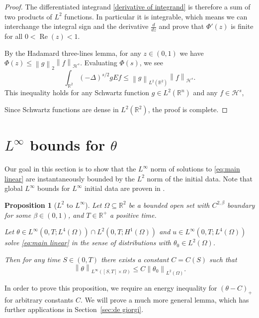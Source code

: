 \documentclass[11pt]{amsart}
\newtheorem{proposition}[theorem]{Proposition}
\theoremstyle{remark}
\theoremstyle{definition}
\newcommand{\R}{\mathbb{R}}
\newcommand{\norm}[1]{\left\lVert#1\right\rVert}
\newcommand{\paren}[1]{\left( #1 \right)}
\newcommand{\Laplace}{\Delta}
\renewcommand{\Re}{\operatorname{Re}}
\newcommand{\ddz}{\frac{d}{dz}}
\newcommand{\HD}{\mathcal{H}}
\begin{document}
\begin{proof}
The differentiated integrand \eqref{derivative of integrand} is therefore a sum of two products of $L^2$ functions.  In particular it is integrable, which means we can interchange the integral sign and the derivative $\ddz$ and prove that $\Phi'(z)$ is finite for all $0<\Re(z)<1$. 

By the Hadamard three-lines lemma, for any $z \in (0,1)$ we have $\Phi(z) \leq \norm{g}_2 \norm{f}_{\HD^s}$.  
Evaluating $\Phi(s)$, we see
\[ \int_{\R^2} \paren{-\Laplace}^{s/2} g E f \leq \norm{g}_{L^2(\R^2)} \norm{f}_{\HD^s}. \]
This inequality holds for any Schwartz function $g \in L^2(\R^n)$ and any $f \in \HD^{s}$,

Since Schwartz functions are dense in $L^2(\R^2)$, the proof is complete.  
\end{proof}






\section{$L^\infty$ bounds for $\theta$} \label{sec:Linfty}

Our goal in this section is to show that the $L^\infty$ norm of solutions to \eqref{eq:main linear} are instantaneously bounded by the $L^2$ norm of the initial data.  Note that global $L^\infty$ bounds for $L^\infty$ initial data are proven in \cite{CoIg.sqg}.  

\begin{proposition}[$L^2$ to $L^\infty$] \label{thm:L2 to Linfty}
Let $\Omega \subseteq \R^2$ be a bounded open set with $C^{2,\beta}$ boundary for some $\beta \in (0,1)$, and $T \in \R^+$ a positive time.  

Let $\theta \in L^\infty(0,T; L^4(\Omega)) \cap L^2(0,T; H^1(\Omega))$ and $u \in L^\infty(0,T; L^4(\Omega))$ solve \eqref{eq:main linear} in the sense of distributions with $\theta_0 \in L^2(\Omega)$.  

Then for any time $S \in (0,T)$ there exists a constant $C = C(S)$ such that
\[ \norm{\theta}_{L^\infty([S,T]\times \Omega)} \leq C \norm{\theta_0}_{L^2(\Omega)}. \]
\end{proposition}

In order to prove this proposition, we require an energy inequality for $(\theta-C)_+$ for arbitrary constants $C$.  We will prove a much more general lemma, which has further applications in Section~\ref{sec:de giorgi}.  
\end{document}
